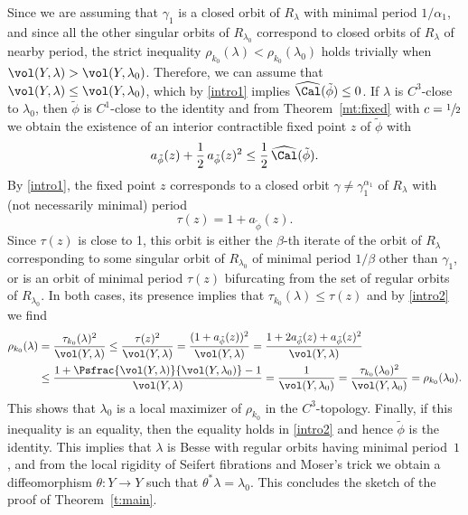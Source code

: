 Since we are assuming that $\gamma_1$ is a closed orbit of $R_{\lambda}$ with minimal period $1/\alpha_1$, and since all the other singular orbits of $R_{\lambda_0}$ correspond to closed orbits of $R_{\lambda}$ of nearby period, the strict inequality $\rho_{k_0}(\lambda)<\rho_{k_0}(\lambda_0)$ holds trivially when $\vol(Y,\lambda) > \vol(Y,\lambda_0)$. Therefore, we can assume that $\vol(Y,\lambda) \leq \vol(Y,\lambda_0)$, which by \eqref{intro1} implies $\widehat{\Cal}(\tilde{\phi})\leq 0$.
If $\lambda$ is $C^3$-close to $\lambda_0$, then $\tilde{\phi}$ is $C^1$-close to the identity and from Theorem~\ref{mt:fixed} with $c=\sfrac{1}{2}$ we obtain the existence of an interior contractible fixed point $z$ of $\tilde\phi$ with
\begin{equation}
\label{intro2}
a_{\tilde{\phi}}(z) + \frac{1}{2} \, a_{\tilde{\phi}}(z)^2 \leq \frac{1}{2} \,\widehat{\Cal}(\tilde{\phi}).
\end{equation}
By \eqref{intro1}, the fixed point $z$ corresponds to a closed orbit $\gamma\neq \gamma_1^{\alpha_1}$ of $R_{\lambda}$ with (not necessarily minimal) period
\[
\tau(z) = 1 + a_{\tilde{\phi}}(z).
\]
Since $\tau(z)$ is close to 1, this orbit is either the $\beta$-th iterate of the orbit of $R_{\lambda}$ corresponding to some singular orbit of $R_{\lambda_0}$ of minimal period $1/\beta$ other than $\gamma_1$, or is an orbit of minimal period $\tau(z)$ bifurcating from the set of regular orbits of $R_{\lambda_0}$. In both cases, its presence implies that $\tau_{k_0}(\lambda) \leq \tau(z)$ and by \eqref{intro2} we find
\[
\begin{split}
\rho_{k_0}(\lambda) &= \frac{\tau_{k_0}(\lambda)^2}{\vol(Y,\lambda)} \leq \frac{\tau(z)^2}{\vol(Y,\lambda)} = \frac{(1+a_{\tilde\phi}(z))^2}{\vol(Y,\lambda)}
=\frac{1+2a_{\tilde\phi}(z)+a_{\tilde\phi}(z)^2}{\vol(Y,\lambda)} \\ &\leq
\frac{1+\Psfrac{\vol(Y,\lambda)}{\vol(Y,\lambda_0)}-1}{\vol(Y,\lambda)}
= \frac{1}{\vol(Y,\lambda_0)} = \frac{\tau_{k_0}(\lambda_0)^2}{\vol(Y,\lambda_0)} = \rho_{k_0}(\lambda_0).
\end{split}
\]
This shows that $\lambda_0$ is a local maximizer of $\rho_{k_0}$ in the $C^3$-topology. Finally, if this inequality is an equality, then the equality holds in \eqref{intro2} and hence $\tilde{\phi}$ is the identity. This implies that $\lambda$ is Besse with regular orbits having minimal period~$1$, and from the local rigidity of Seifert fibrations and Moser's trick we obtain a diffeomorphism $\theta: Y\to Y$ such that $\theta^* \lambda = \lambda_0$.
This concludes the sketch of the proof of Theorem~\ref{t:main}.

